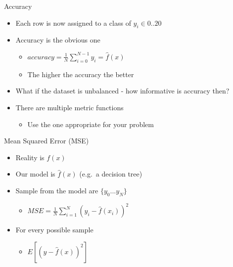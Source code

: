 \documentclass[obeyspaces,aspectratio=43]{beamer}
\providecommand{\tightlist}{%
  \setlength{\itemsep}{0pt}\setlength{\parskip}{0pt}}
\begin{document}
\begin{frame}{Accuracy}

\begin{itemize}
\item
  Each row is now assigned to a class of \({y_i} \in{0..20}\)
\item
  Accuracy is the obvious one

  \begin{itemize}
  \tightlist
  \item
    \(\mathit{accuracy} = \frac{1} {N} \sum\limits_{i=0}^{N-1} {y_i = \hat{f}(x) }\)
  \item
    The higher the accuracy the better
  \end{itemize}
\item
  What if the dataset is unbalanced - how informative is accuracy then?
\item
  There are multiple metric functions

  \begin{itemize}
  \tightlist
  \item
    Use the one appropriate for your problem
  \end{itemize}
\end{itemize}

\end{frame}

\begin{frame}{Mean Squared Error (MSE)}

\begin{itemize}
\item
  Reality is \(f(x)\)
\item
  Our model is \(\hat{f}(x)\) (e.g.~a decision tree)
\item
  Sample from the model are \(\{y_{0}... y_{N}\}\)

  \begin{itemize}
  \tightlist
  \item
    \(MSE = \frac{1} {N} \sum\limits_{i = 1}^N \left( y_{i} - \hat{f}(x_{i}) \right)^2\)
  \end{itemize}
\item
  For every possible sample

  \begin{itemize}
  \tightlist
  \item
    \(E\left[\left(y-\hat{f}(x)\right)^2\right]\)
  \end{itemize}
\end{itemize}

\end{frame}
\end{document}
